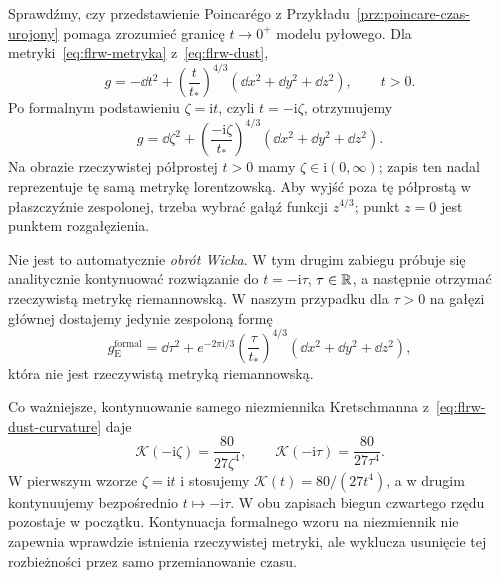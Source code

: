 \begin{przyklad}
\label{prz:flrw-czas-zespolony}
Sprawdźmy, czy przedstawienie Poincarégo z
Przykładu~\ref{prz:poincare-czas-urojony} pomaga
zrozumieć granicę $t\to0^+$ modelu pyłowego.
Dla metryki~\eqref{eq:flrw-metryka} z~\eqref{eq:flrw-dust},
\[
 g=-\dd t^2+\left(\frac{t}{t_*}\right)^{4/3}
    (\dd x^2+\dd y^2+\dd z^2),\qquad t>0.
\]
Po formalnym podstawieniu $\zeta=\mathrm{i}t$,
czyli $t=-\mathrm{i}\zeta$, otrzymujemy
\begin{equation}\label{eq:flrw-complex-time}
 g=\dd\zeta^2+
 \left(\frac{-\mathrm{i}\zeta}{t_*}\right)^{4/3}
 (\dd x^2+\dd y^2+\dd z^2).
\end{equation}
Na obrazie rzeczywistej półprostej $t>0$ mamy
$\zeta\in\mathrm{i}(0,\infty)$; zapis ten nadal
reprezentuje tę samą metrykę lorentzowską.
Aby wyjść poza tę półprostą w płaszczyźnie
zespolonej, trzeba wybrać gałąź funkcji
$z^{4/3}$; punkt $z=0$ jest punktem rozgałęzienia.

Nie jest to automatycznie \emph{obrót Wicka}.
W tym drugim zabiegu próbuje się analitycznie
kontynuować rozwiązanie do $t=-\mathrm{i}\tau$,
$\tau\in\mathbb{R}$, a następnie otrzymać rzeczywistą
metrykę riemannowską. W naszym przypadku dla
$\tau>0$ na gałęzi głównej dostajemy jedynie
zespoloną formę
\[
 g_{\mathrm E}^{\mathrm{formal}}
 =\dd\tau^2+e^{-2\pi\mathrm{i}/3}
  \left(\frac{\tau}{t_*}\right)^{4/3}
  (\dd x^2+\dd y^2+\dd z^2),
\]
która nie jest rzeczywistą metryką riemannowską.

Co ważniejsze, kontynuowanie samego niezmiennika
Kretschmanna z~\eqref{eq:flrw-dust-curvature}
daje
\[
 \mathcal K(-\mathrm{i}\zeta)
  =\frac{80}{27\zeta^4},\qquad
 \mathcal K(-\mathrm{i}\tau)
  =\frac{80}{27\tau^4}.
\]
W pierwszym wzorze $\zeta=\mathrm{i}t$ i stosujemy
$\mathcal K(t)=80/(27t^4)$, a w drugim
kontynuujemy bezpośrednio $t\mapsto-\mathrm{i}\tau$.
W obu zapisach biegun czwartego rzędu pozostaje
w początku. Kontynuacja formalnego wzoru na
niezmiennik nie zapewnia wprawdzie istnienia
rzeczywistej metryki, ale wyklucza usunięcie
tej rozbieżności przez samo przemianowanie czasu.


\end{przyklad}
